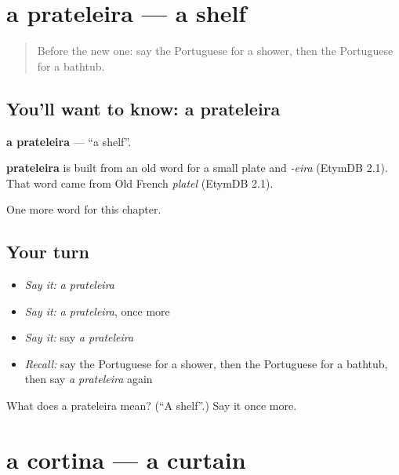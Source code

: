 \section[a prateleira]{a prateleira — a shelf}

\label{lesson:PT-C94-prateleira}



\begin{quote}
Before the new one: say the Portuguese for a shower, then the Portuguese for a bathtub.
\end{quote}

\subsection*{You'll want to know: a prateleira}
\textbf{a prateleira} — \textquotedblleft{}a shelf\textquotedblright{}.

\begin{cousinweb}
\textbf{prateleira} is built from an old word for a small plate and \emph{-eira} (EtymDB 2.1). That word came from Old French \emph{platel} (EtymDB 2.1).
\end{cousinweb}

\begin{grammarlens}[title={What you've built}]
One more word for this chapter.
\end{grammarlens}

\subsection*{Your turn}
\begin{itemize}
\raggedright
  \item \emph{Say it:} \emph{a prateleira}
  \item \emph{Say it:} \emph{a prateleira}, once more
  \item \emph{Say it:} say \emph{a prateleira}
  \item \emph{Recall:} say the Portuguese for a shower, then the Portuguese for a bathtub, then say \emph{a prateleira} again
\end{itemize}

\begin{tcolorbox}[breakable,colback=teal!4,colframe=teal!35!black,title={Before you move on}]
What does a prateleira mean? (\textquotedblleft{}A shelf\textquotedblright{}.) Say it once more.
\end{tcolorbox}
\section[a cortina]{a cortina — a curtain}

